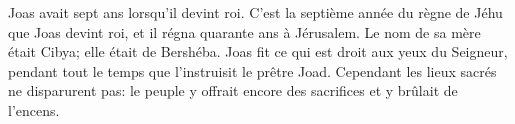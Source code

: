 Joas avait sept ans lorsqu’il devint roi.
C’est la septième année du règne de Jéhu que Joas devint roi,
	et il régna quarante ans à Jérusalem.
	Le nom de sa mère était Cibya; elle était de Bershéba.
Joas fit ce qui est droit aux yeux du Seigneur,
	pendant tout le temps que l’instruisit le prêtre Joad.
Cependant les lieux sacrés ne disparurent pas:
	le peuple y offrait encore des sacrifices et y brûlait de l’encens.
